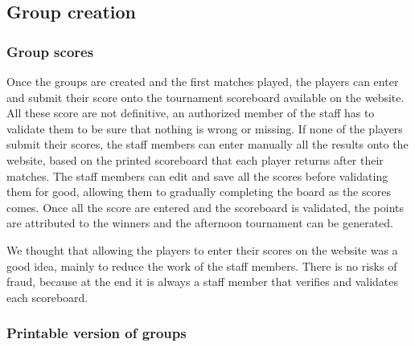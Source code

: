 \subsection{Group creation}
\label{sub:Group creation}


\subsubsection{Group scores}
\label{subs:Group scores}


Once the groups are created and the first matches played, the players can enter and submit their score onto the tournament scoreboard available on the website. All these score are not definitive, an authorized member of the staff has to validate them to be sure that nothing is  wrong or missing. If none of the players submit their scores, the staff members can enter manually all the results onto the website, based on the printed scoreboard that each player returns after their matches. The staff members can edit and save all the scores before validating them for good, allowing them to gradually completing the board as the scores comes. Once all the score are entered and the scoreboard is validated, the points are attributed to the winners and the afternoon tournament can be generated. \newline

We thought that allowing the players to enter their scores on the website was a good idea, mainly to reduce the work of the staff members. There is no risks of fraud, because at the end it is always a staff member that verifies and validates each scoreboard.

\subsubsection{Printable version of groups}
\label{subs:Printable version of groups}

